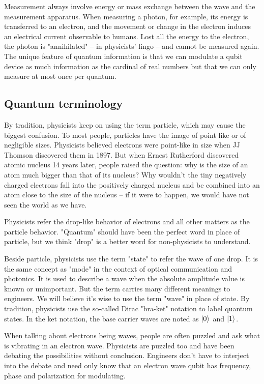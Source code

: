 \documentclass[Letter,11pt]{book}
\begin{document}
Measurement always involve energy or mass exchange between the wave and the measurement apparatus. When measuring a photon, for example, its energy is transferred to an electron, and the movement or change in the electron induces an electrical current observable to humans. Lost all the energy to the electron, the photon is "annihilated" -- in physicists' lingo -- and cannot be measured again. The unique feature of quantum information is that we can modulate a qubit device as much information as the cardinal of real numbers but that we can only measure at most once per quantum.

\subsection{Quantum terminology}
By tradition, physicists keep on using the term particle, which may cause the biggest confusion. To most people, particles have the image of point like or of negligible sizes. Physicists believed electrons were point-like in size when JJ Thomson discovered them in 1897. But when Ernest Rutherford discovered atomic nucleus 14 years later, people raised the question: why is the size of an atom much bigger than that of its nucleus? Why wouldn't the tiny negatively charged electrons fall into the positively charged nucleus and be combined into an atom close to the size of the nucleus -- if it were to happen, we would have not seen the world as we have.

Physicists refer the drop-like behavior of electrons and all other matters as the particle behavior. "Quantum" should have been the perfect word in place of particle, but we think "drop" is a better word for non-physicists to understand.

Beside particle, physicists use the term "state" to refer the wave of one drop. It is the same concept as "mode" in the context of optical communication and photonics. It is used to describe a wave when the absolute amplitude value is known or unimportant. But the term carries many different meanings to engineers. We will believe it's wise to use the term "wave" in place of state. By tradition, physicists use the so-called Dirac "bra-ket" notation to label quantum states. In the ket notation, the base carrier waves are noted as $\vert {0} \rangle_{}$ and $\vert {1} \rangle_{}$.

When talking about electrons being waves, people are often puzzled and ask what is vibrating in an electron wave. Physicists are puzzled too and have been debating the possibilities without conclusion. Engineers don't have to interject into the debate and need only know that an electron wave qubit has frequency, phase and polarization for modulating.
\end{document}

